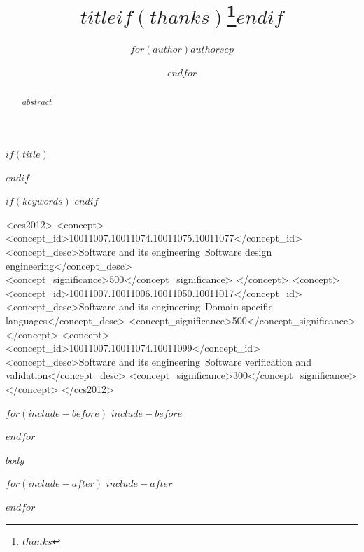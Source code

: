 \documentclass[sigconf,screen,review]{acmart}
\title{$title$$if(thanks)$\thanks{$thanks$}$endif$}
\author{$for(author)$$author$$sep$ \and $endfor$}
\affiliation{
  \institution{$institute$}
$if(city)$
  \city{$city$}
$endif$
$if(country)$
  \country{$country$}
$else$
  \country{China}
$endif$
}
\begin{document}
$if(title)$
\begin{abstract}
$abstract$
\end{abstract}
$endif$

$if(keywords)$
$endif$

\begin{CCSXML}
<ccs2012>
   <concept>
       <concept_id>10011007.10011074.10011075.10011077</concept_id>
       <concept_desc>Software and its engineering~Software design engineering</concept_desc>
       <concept_significance>500</concept_significance>
       </concept>
   <concept>
       <concept_id>10011007.10011006.10011050.10011017</concept_id>
       <concept_desc>Software and its engineering~Domain specific languages</concept_desc>
       <concept_significance>500</concept_significance>
       </concept>
   <concept>
       <concept_id>10011007.10011074.10011099</concept_id>
       <concept_desc>Software and its engineering~Software verification and validation</concept_desc>
       <concept_significance>300</concept_significance>
       </concept>
</ccs2012>
\end{CCSXML}


\maketitle

$for(include-before)$
$include-before$

$endfor$

$body$

$for(include-after)$
$include-after$

$endfor$
\end{document}
